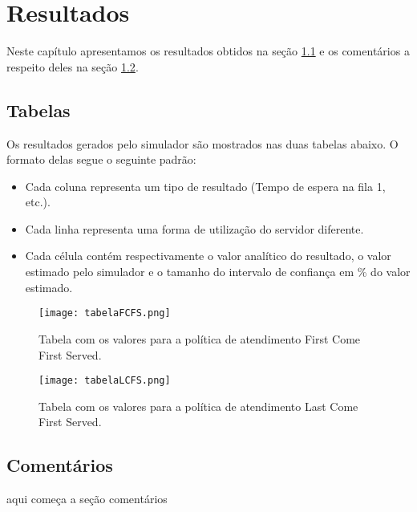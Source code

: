 \chapter{Resultados}

Neste capítulo apresentamos os resultados obtidos na seção \ref{sec:tabelas} e os comentários a respeito deles na seção \ref{sec:coment}.

\section{Tabelas}
\label{sec:tabelas}

Os resultados gerados pelo simulador são mostrados nas duas tabelas abaixo. O formato delas segue o seguinte padrão:\\
\begin{itemize}
  \item Cada coluna representa um tipo de resultado (Tempo de espera na fila 1, etc.).
  \item Cada linha representa uma forma de utilização do servidor diferente.
  \item Cada célula contém respectivamente o valor analítico do resultado, o valor estimado pelo simulador e o tamanho do intervalo de confiança em \% do valor estimado.
\end{itemize}
\pagebreak
\begin{figure}[htb!]
   \texttt{[image: tabelaFCFS.png]}
   \caption{Tabela com os valores para a política de atendimento First Come First Served.}
\end{figure}

\pagebreak
\begin{figure}[htb!]
   \texttt{[image: tabelaLCFS.png]}
   \caption{Tabela com os valores para a política de atendimento Last Come First Served.}
\end{figure}

\pagebreak

\section{Comentários}
\label{sec:coment}
aqui começa a seção comentários
